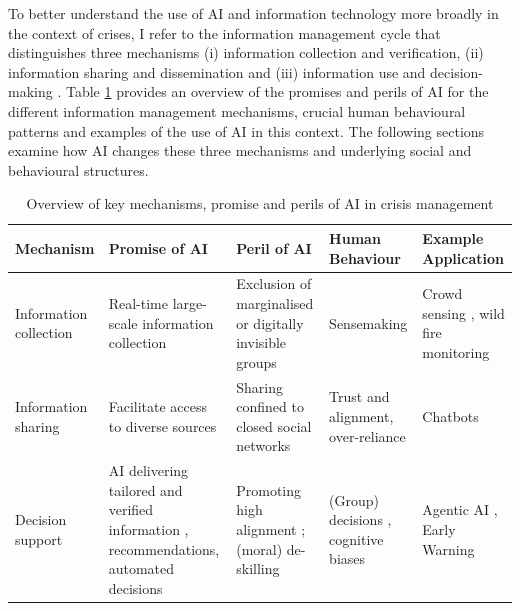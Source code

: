 \documentclass[pdflatex,sn-apa]{sn-jnl}%
\begin{document}
To better understand the use of AI and information technology more broadly in the context of crises, I refer to the information management cycle that distinguishes three mechanisms (i) information collection and verification, (ii) information sharing and dissemination and (iii) information use and decision-making \citep{van2015On}. Table \ref{tab:AIcrisis-overview} provides an overview of the promises and perils of AI for the different information management mechanisms, crucial human behavioural patterns and examples of the use of AI in this context. The following sections examine how AI changes these three mechanisms and underlying social and behavioural structures.

\begin{table}
    \small
    \centering
    \begin{tabular}{p{} | p{} p{}p{} p{}}
        \hline
        \textbf{Mechanism} & \textbf{Promise of AI} &\textbf{ Peril of AI} & \textbf{Human Behaviour} & \textbf{Example Application}\\ \hline
        Information collection & Real-time large-scale information collection \citep{narmatha2025disaster} & Exclusion of marginalised or digitally invisible groups \citep{coleman2024weaving} & Sensemaking \citep{klein2010rapid} & Crowd sensing \citep{mai2025evaluating}, wild fire monitoring \citep{roy2024multi}\\ \hline
        Information sharing & Facilitate access to diverse sources \citep{jeon2024hearhere} & Sharing confined to closed social networks & Trust and alignment, over-reliance \citep{manzini2024should} & Chatbots \citep{urbanelli2024ermes}\\ \hline
        Decision support &  AI delivering tailored and verified information \citep{zhao2025tailoring}, recommendations, automated decisions & Promoting high alignment \citep{manzini2024should}; (moral) de-skilling \citep{vallor2015moral} & (Group) decisions \citep{comes2024ai}, cognitive biases \citep{paulus2022influence} & Agentic AI \citep{acharya2025agentic}, Early Warning \citep{reichstein2025early}\\ \hline
    \end{tabular}
    \caption{Overview of key mechanisms, promise and perils of AI in crisis management}
    \label{tab:AIcrisis-overview}
\end{table}
\end{document}
